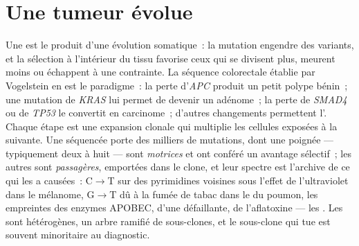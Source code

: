 \section{Une tumeur évolue}

\begin{proposition}\label{prop:b3:cancer-biology:multistep}
Une  est le produit d'une évolution somatique~: la mutation
engendre des variants, et la sélection à l'intérieur du tissu favorise
ceux qui se divisent plus, meurent moins ou échappent à une contrainte.
La séquence colorectale établie par Vogelstein en est le paradigme~: la
perte d'\emph{APC} produit un petit polype bénin~; une mutation de
\emph{KRAS} lui permet de devenir un adénome~; la perte de
\emph{SMAD4} ou de \emph{TP53} le convertit en carcinome~; d'autres
changements permettent l'. Chaque étape est une expansion
clonale qui multiplie les cellules exposées à la suivante. Une 
séquencée porte des milliers de mutations, dont une poignée ---
typiquement deux à huit --- sont \emph{motrices} et ont conféré un
avantage sélectif~; les autres sont \emph{passagères}, emportées dans
le clone, et leur spectre est l'archive de ce qui les a causées~:
C$\to$T sur des pyrimidines voisines sous l'effet de l'ultraviolet dans
le mélanome, G$\to$T dû à la fumée de tabac dans le  du poumon,
les empreintes des enzymes APOBEC, d'une 
défaillante, de l'aflatoxine --- les \emph{}.
Les  sont hétérogènes, un arbre ramifié de sous-clones, et le
sous-clone qui tue est souvent minoritaire au diagnostic.
\end{proposition}

